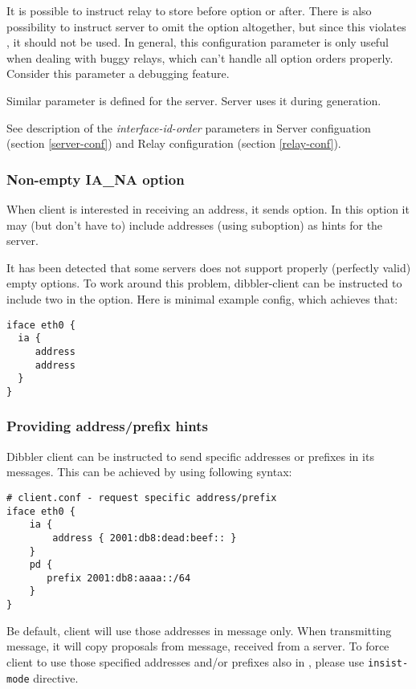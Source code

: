 \begin{enumerate}
It is possible to instruct relay to store  before
 option or after. There is also possibility to
instruct server to omit the  option altogether, but
since this violates \cite{rfc3315}, it should not be used. In general,
this configuration parameter is only useful when dealing with buggy
relays, which can't handle all option orders properly. Consider this
parameter a debugging feature.

Similar parameter is defined for the server. Server uses it during
 generation.

See description of the \emph{interface-id-order} parameters in Server
configuation (section \ref{server-conf}) and Relay configuration
(section \ref{relay-conf}).

\subsubsection{Non-empty IA\_NA option}
When client is interested in receiving an address, it sends
 option. In this option it may (but don't have to) include
addresses (using  suboption) as hints for the server.

It has been detected that some servers does not support properly
(perfectly valid) empty  options. To work around this
problem, dibbler-client can be instructed to include two 
in the  option. Here is minimal example config, which
achieves that:

\begin{lstlisting}
iface eth0 {
  ia {
     address
     address
  }
}
\end{lstlisting}

\subsubsection{Providing address/prefix hints}
Dibbler client can be instructed to send specific addresses or
prefixes in its  messages. This can be achieved by using
following syntax:
\begin{lstlisting}
# client.conf - request specific address/prefix
iface eth0 {
    ia {
        address { 2001:db8:dead:beef:: }
    }
    pd {
       prefix 2001:db8:aaaa::/64
    }
}
\end{lstlisting}

Be default, client will use those addresses in  message
only. When transmitting  message, it will copy proposals
from  message, received from a server. To force client
to use those specified addresses and/or prefixes also in
, please use \verb+insist-mode+ directive.


\end{enumerate}

